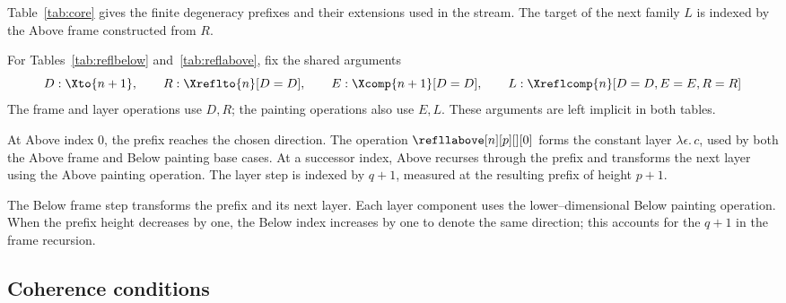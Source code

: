 \documentclass[a4paper,UKenglish,cleveref,autoref]{lipics-v2021}
\renewcommand{\D}{D}
\newcommand{\R}{R}
\renewcommand{\E}{E}
\begin{document}


Table~\ref{tab:core} gives the finite degeneracy prefixes and their extensions used in the stream. The target of the next family $L$ is indexed by the Above frame constructed from $R$.



For Tables~\ref{tab:reflbelow} and~\ref{tab:reflabove}, fix the shared arguments
\begin{equation*}
  D:\Xto{n+1},\qquad R:\Xreflto{n}[D=\D],\qquad
  E:\Xcomp{n+1}[D=\D],\qquad L:\Xreflcomp{n}[D=\D,E=\E,R=\R]
\end{equation*}
The frame and layer operations use $D,R$; the painting operations also use $E,L$. These arguments are left implicit in both tables.




At Above index $0$, the prefix reaches the chosen direction. The operation $\refllabove[n][p][][0]$ forms the constant layer $\lambda\epsilon.\,c$, used by both the Above frame and Below painting base cases. At a successor index, Above recurses through the prefix and transforms the next layer using the Above painting operation. The layer step is indexed by $q+1$, measured at the resulting prefix of height $p+1$.

The Below frame step transforms the prefix and its next layer. Each layer component uses the lower--dimensional Below painting operation. When the prefix height decreases by one, the Below index increases by one to denote the same direction; this accounts for the $q+1$ in the frame recursion.

\subsection{Coherence conditions}
\label{sec:coherences}
\end{document}
